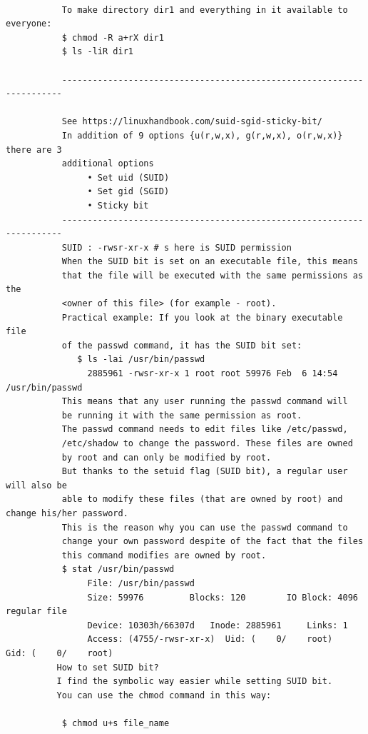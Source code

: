 \documentclass[a4paper,12pt]{article}
\begin{document}
\begin{verbatim}
           
           To make directory dir1 and everything in it available to everyone: 
           $ chmod -R a+rX dir1
           $ ls -liR dir1 
           
           ----------------------------------------------------------------------
           
           See https://linuxhandbook.com/suid-sgid-sticky-bit/
           In addition of 9 options {u(r,w,x), g(r,w,x), o(r,w,x)} there are 3 
           additional options
                • Set uid (SUID)
                • Set gid (SGID)
                • Sticky bit
           ----------------------------------------------------------------------
           SUID : -rwsr-xr-x # s here is SUID permission
           When the SUID bit is set on an executable file, this means 
           that the file will be executed with the same permissions as the 
           <owner of this file> (for example - root).
           Practical example: If you look at the binary executable file
           of the passwd command, it has the SUID bit set:
              $ ls -lai /usr/bin/passwd 
                2885961 -rwsr-xr-x 1 root root 59976 Feb  6 14:54 /usr/bin/passwd
           This means that any user running the passwd command will
           be running it with the same permission as root. 
           The passwd command needs to edit files like /etc/passwd,
           /etc/shadow to change the password. These files are owned 
           by root and can only be modified by root.
           But thanks to the setuid flag (SUID bit), a regular user will also be
           able to modify these files (that are owned by root) and change his/her password.   
           This is the reason why you can use the passwd command to 
           change your own password despite of the fact that the files
           this command modifies are owned by root.
           $ stat /usr/bin/passwd
                File: /usr/bin/passwd
                Size: 59976     	Blocks: 120        IO Block: 4096   regular file
                Device: 10303h/66307d	Inode: 2885961     Links: 1
                Access: (4755/-rwsr-xr-x)  Uid: (    0/    root)   Gid: (    0/    root)
          How to set SUID bit?
          I find the symbolic way easier while setting SUID bit.
          You can use the chmod command in this way:

           $ chmod u+s file_name
           

\end{verbatim}
\end{document}
